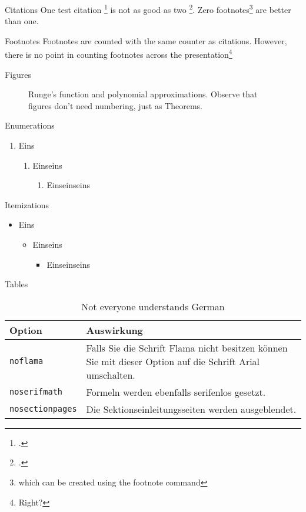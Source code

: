\documentclass{beamer}
\begin{document}
\begin{frame}{Citations}
One test citation \footcite{AdamsFournier2003} is not as good as two \footcite{AlexanderianPetraStadlerEtAl2016}. 
Zero footnotes\footnote{which can be created using the footnote command} are better than one.
\end{frame}

\begin{frame}{Footnotes}
Footnotes are counted with the same counter as citations. However, there is no point in counting footnotes across the presentation\footnote{Right?}
\end{frame}
	
\begin{frame}{Figures}
\begin{figure}
	\scalebox{0.6}{}
	\caption{Runge's function and polynomial approximations. Observe that figures don't need numbering, just as Theorems.}
\end{figure}
\end{frame}

\begin{frame}{Enumerations}
\begin{enumerate}
	\item Eins
	\begin{enumerate}
		\item Einseins
		\begin{enumerate}
			\item Einseinseins
		\end{enumerate}
	\end{enumerate}
\end{enumerate}
\end{frame}

\begin{frame}{Itemizations}
\begin{itemize}
	\item Eins
	\begin{itemize}
		\item Einseins
		\begin{itemize}
			\item Einseinseins
		\end{itemize}
	\end{itemize}
\end{itemize}
\end{frame}

\begin{frame}{Tables}
\begin{table}[]
	\begin{tabularx}{\linewidth}{l>{\raggedright}X}
			\toprule
			\textbf{Option}			& \textbf{Auswirkung} \tabularnewline
			\midrule
			\texttt{noflama}		& Falls Sie die Schrift Flama nicht besitzen können Sie mit dieser Option auf die Schrift Arial umschalten. \tabularnewline
			\texttt{noserifmath}		& Formeln werden ebenfalls serifenlos gesetzt. \tabularnewline
			\texttt{nosectionpages} & Die Sektionseinleitungsseiten werden ausgeblendet.\tabularnewline
			\bottomrule
	\end{tabularx}
	\caption{Not everyone understands German}
\end{table}
\end{frame}
\end{document}
